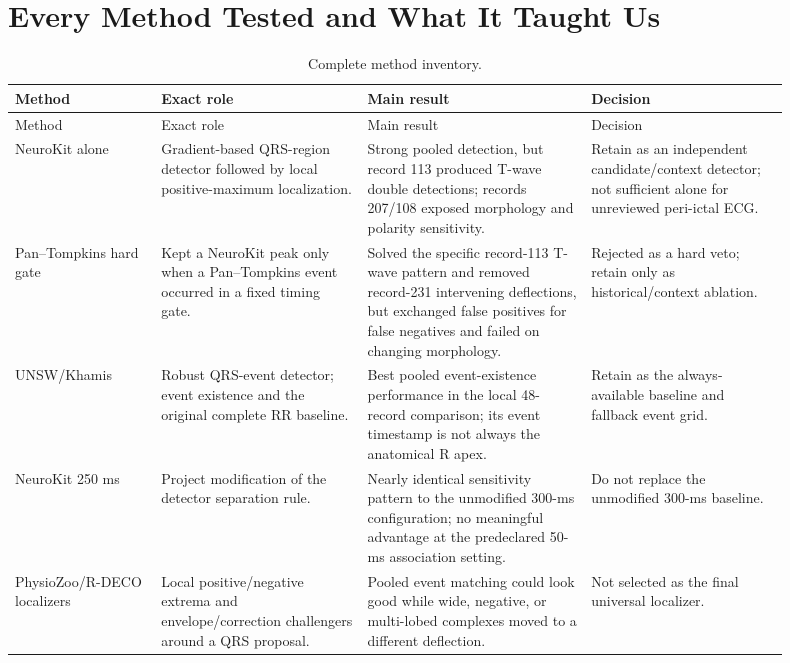 \documentclass[10pt]{article}
\newcommand{\method}[1]{\textsf{#1}}
\begin{document}
\section{Every Method Tested and What It Taught Us}

\begin{longtable}{>{\raggedright\arraybackslash}p{0.17\linewidth}
                  >{\raggedright\arraybackslash}p{0.24\linewidth}
                  >{\raggedright\arraybackslash}p{0.26\linewidth}
                  >{\raggedright\arraybackslash}p{0.23\linewidth}}
\caption{Complete method inventory.}\label{tab:methods}\\
\toprule
Method & Exact role & Main result & Decision \\
\midrule
\endfirsthead
\toprule
Method & Exact role & Main result & Decision \\
\midrule
\endhead
\method{NeuroKit alone} & Gradient-based QRS-region detector followed by local positive-maximum localization. & Strong pooled detection, but record 113 produced T-wave double detections; records 207/108 exposed morphology and polarity sensitivity. & Retain as an independent candidate/context detector; not sufficient alone for unreviewed peri-ictal ECG. \\
\addlinespace
\method{Pan--Tompkins hard gate} & Kept a NeuroKit peak only when a Pan--Tompkins event occurred in a fixed timing gate. & Solved the specific record-113 T-wave pattern and removed record-231 intervening deflections, but exchanged false positives for false negatives and failed on changing morphology. & Rejected as a hard veto; retain only as historical/context ablation. \\
\addlinespace
\method{UNSW/Khamis} & Robust QRS-event detector; event existence and the original complete RR baseline. & Best pooled event-existence performance in the local 48-record comparison; its event timestamp is not always the anatomical R apex. & Retain as the always-available baseline and fallback event grid. \\
\addlinespace
\method{NeuroKit 250 ms} & Project modification of the detector separation rule. & Nearly identical sensitivity pattern to the unmodified 300-ms configuration; no meaningful advantage at the predeclared 50-ms association setting. & Do not replace the unmodified 300-ms baseline. \\
\addlinespace
\method{PhysioZoo/R-DECO localizers} & Local positive/negative extrema and envelope/correction challengers around a QRS proposal. & Pooled event matching could look good while wide, negative, or multi-lobed complexes moved to a different deflection. & Not selected as the final universal localizer. \\

\end{longtable}
\end{document}
